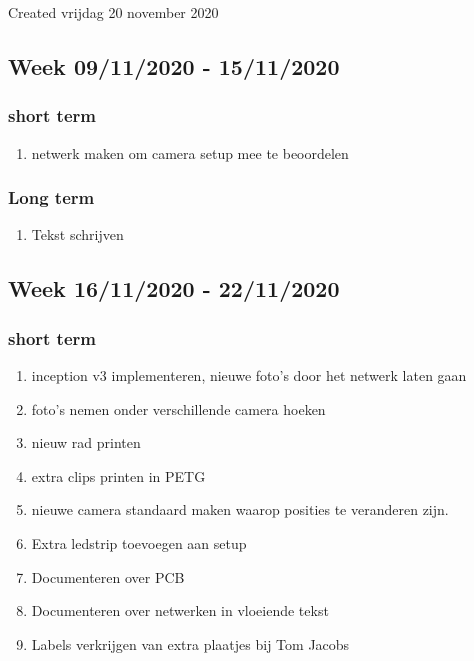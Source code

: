 \documentclass{article}
\begin{document}
Created vrijdag 20 november 2020



\subsection{Week 09/11/2020 - 15/11/2020}



\subsubsection{short term}

\begin{enumerate}[1]
\item netwerk maken om camera setup mee te beoordelen
\end{enumerate}


\subsubsection{Long term}

\begin{enumerate}[1]
\item Tekst schrijven
\end{enumerate}


\subsection{Week 16/11/2020 - 22/11/2020}



\subsubsection{short term}

\begin{enumerate}[1]
\item inception v3 implementeren, nieuwe foto's door het netwerk laten gaan
\item foto's nemen onder verschillende camera hoeken
\item nieuw rad printen 
\item extra clips printen in PETG
\item nieuwe camera standaard maken waarop posities te veranderen zijn.
\item Extra ledstrip toevoegen aan setup
\item Documenteren over PCB
\item Documenteren over netwerken in vloeiende tekst
\item Labels verkrijgen van extra plaatjes bij Tom Jacobs
\end{enumerate}
\end{document}
